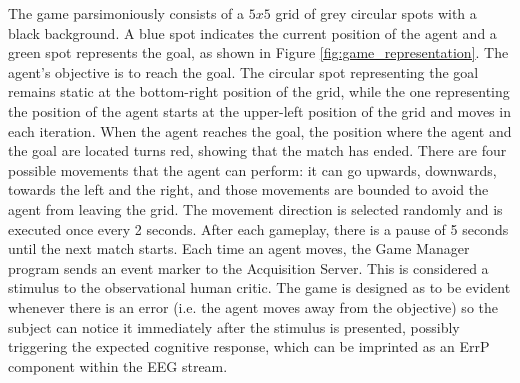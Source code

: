 \documentclass[journal]{IEEEtran}
\begin{document}
\label{cognitive_experiment_system}{
The game parsimoniously consists of a $5x5$ grid of grey circular spots with a black background.  A blue spot indicates the current position of the agent and a green spot represents the goal, as shown in Figure  \ref{fig:game_representation}. The agent's objective is to reach the goal. The circular spot representing the goal remains static at the bottom-right position of the grid, while the one representing the position of the agent starts at the upper-left position of the grid and moves in each iteration.  When the agent reaches the goal, the position where the agent and the goal are located turns red, showing that the match has ended. There are four possible movements that the agent can perform: it can go upwards, downwards, towards the left and the right, and those movements are bounded to avoid the agent from leaving the grid. The movement direction is selected randomly and is executed once every 2 seconds.  After each gameplay, there is a pause of 5 seconds until the next match starts. Each time an agent moves, the Game Manager program sends an event marker to the Acquisition Server.  This is considered a stimulus to the observational human critic.  The game is designed as to be evident whenever there is an error (i.e. the agent moves away from the objective) so the subject can notice it immediately after the stimulus is presented, possibly triggering the expected cognitive response, which can be imprinted as an ErrP component within the EEG stream.

}
\end{document}
